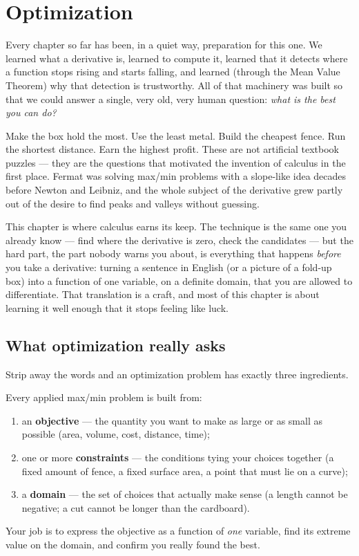 \chapter{Optimization}

Every chapter so far has been, in a quiet way, preparation for this one. We learned
what a derivative is, learned to compute it, learned that it detects where a function
stops rising and starts falling, and learned (through the Mean Value Theorem) why
that detection is trustworthy. All of that machinery was built so that we could
answer a single, very old, very human question: \emph{what is the best you can do?}

Make the box hold the most. Use the least metal. Build the cheapest fence. Run the
shortest distance. Earn the highest profit. These are not artificial textbook
puzzles --- they are the questions that motivated the invention of calculus in the
first place. Fermat was solving max/min problems with a slope-like idea decades
before Newton and Leibniz, and the whole subject of the derivative grew partly out
of the desire to find peaks and valleys without guessing.

This chapter is where calculus earns its keep. The technique is the same one you
already know --- find where the derivative is zero, check the candidates --- but the
hard part, the part nobody warns you about, is everything that happens \emph{before}
you take a derivative: turning a sentence in English (or a picture of a fold-up box)
into a function of one variable, on a definite domain, that you are allowed to
differentiate. That translation is a craft, and most of this chapter is about
learning it well enough that it stops feeling like luck.

\section{What optimization really asks}

Strip away the words and an optimization problem has exactly three ingredients.

\begin{focusbox}
Every applied max/min problem is built from:
\begin{enumerate}
  \item an \textbf{objective} --- the quantity you want to make as large or as small
    as possible (area, volume, cost, distance, time);
  \item one or more \textbf{constraints} --- the conditions tying your choices
    together (a fixed amount of fence, a fixed surface area, a point that must lie on
    a curve);
  \item a \textbf{domain} --- the set of choices that actually make sense (a length
    cannot be negative; a cut cannot be longer than the cardboard).
\end{enumerate}
Your job is to express the objective as a function of \emph{one} variable, find its
extreme value on the domain, and confirm you really found the best.
\end{focusbox}

